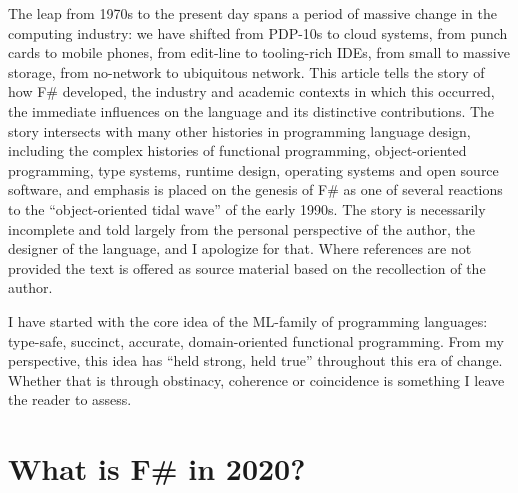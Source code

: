 \documentclass[acmsmall]{acmart}\settopmatter{}
\begin{document}
The leap from 1970s to the present day spans a period of massive change in the computing industry: we have shifted
from PDP-10s to cloud systems, from punch cards to mobile phones, from edit-line to tooling-rich IDEs, from small to
massive storage, from no-network to ubiquitous network. This article tells the story of how F\# developed, the
industry and academic contexts in which this occurred, the immediate influences on the language and its distinctive
contributions. The story intersects with many other histories in programming language design, including the complex
histories of functional programming, object-oriented programming, type systems, runtime design, operating systems and
open source software, and emphasis is placed on the genesis of F\# as one of several reactions to the ``object-oriented
tidal wave'' of the early 1990s.  The story is necessarily incomplete and told largely from the personal perspective of the
author, the designer of the language, and I apologize for that. Where references are not provided the text is offered
as source material based on the recollection of the author.

I have started with the core idea of the ML-family of programming languages: type-safe, succinct, accurate,
domain-oriented functional programming. From my perspective, this idea has “held strong, held true” throughout this
era of change. Whether that is through obstinacy, coherence or coincidence is something I leave the reader to assess. 

\section*{What is F\# in 2020?}
\end{document}
